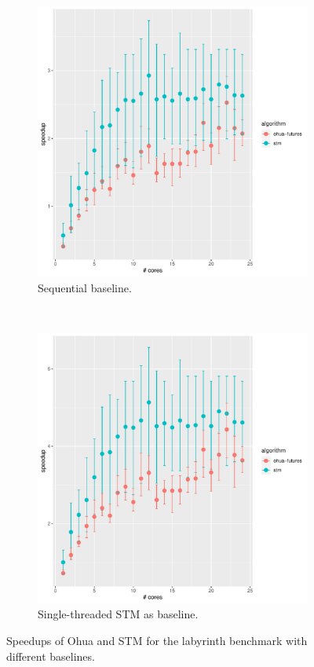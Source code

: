 \begin{figure}[t]
    \begin{subfigure}[t]{.48\textwidth}
        \includegraphics[width=\textwidth,keepaspectratio]{gfx/results/labyrinth/labyrinth+}
        \caption{Sequential baseline.}%
        \label{fig:related:ohua-plots:orig}
    \end{subfigure}
    ~
    \begin{subfigure}[t]{.48\textwidth}
        \includegraphics[width=\textwidth,keepaspectratio]{gfx/results/labyrinth/labyrinth+_stm_base}
        \caption{Single-threaded STM as baseline.}%
        \label{fig:related:ohua-plots:stm}
    \end{subfigure}
    \caption{Speedups of Ohua and STM for the labyrinth benchmark with different baselines.}%
    \label{fig:related:ohua-plots}
\end{figure}

